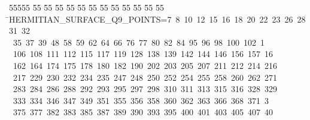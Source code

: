 %
%
\begin{tabbing}
55555 \= 55 \= 55 \= 55 \= 55 \= 55 \= 55 \= 55 \= 55 \= 55 \= 55 \= 55 \= 55 \= \>HERMITIAN\_SURFACE\_Q9\_POINTS=7\ 8\ 10\ 12\ 15\ 16\ 18\ 20\ 22\ 23\ 26\ 28\ 31\ 32\\[0pt]
\>\ 35\ 37\ 39\ 48\ 58\ 59\ 62\ 64\ 66\ 76\ 77\ 80\ 82\ 84\ 95\ 96\ 98\ 100\ 102\ 1\\[0pt]
\ 106\ 108\ 111\ 112\ 115\ 117\ 119\ 128\ 138\ 139\ 142\ 144\ 146\ 156\ 157\ 16\\[0pt]
\ 162\ 164\ 174\ 175\ 178\ 180\ 182\ 190\ 202\ 203\ 205\ 207\ 211\ 212\ 214\ 216\\[0pt]
\>\ 217\ 229\ 230\ 232\ 234\ 235\ 247\ 248\ 250\ 252\ 254\ 255\ 258\ 260\ 262\ 271\\[0pt]
\>\ 283\ 284\ 286\ 288\ 292\ 293\ 295\ 297\ 298\ 310\ 311\ 313\ 315\ 316\ 328\ 329\ \\[0pt]
\ 333\ 334\ 346\ 347\ 349\ 351\ 355\ 356\ 358\ 360\ 362\ 363\ 366\ 368\ 371\ 3\\[0pt]
\ 375\ 377\ 382\ 383\ 385\ 387\ 389\ 390\ 393\ 395\ 400\ 401\ 403\ 405\ 407\ 40\\[0pt]

\end{tabbing}
